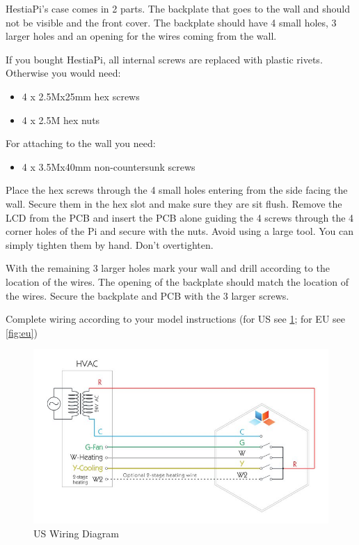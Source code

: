 HestiaPi's case comes in 2 parts. The backplate that goes to the wall and
should not be visible and the front cover. The backplate should have 4 small
holes, 3 larger holes and an opening for the wires coming from the wall.

If you bought HestiaPi, all internal screws are replaced with plastic rivets.
Otherwise you would need:

\begin{itemize}
\item 4 x 2.5Mx25mm hex screws
\item 4 x 2.5M hex nuts
\end{itemize}

For attaching to the wall you need:
\begin{itemize}
\item 4 x 3.5Mx40mm non-countersunk screws
\end{itemize}

Place the hex screws through the 4 small holes entering from the side facing
the wall. Secure them in the hex slot and make sure they are sit flush. Remove
the LCD from the PCB and insert the PCB alone guiding the 4 screws through the
4 corner holes of the Pi and secure with the nuts. Avoid using a large tool.
You can simply tighten them by hand. Don't overtighten.

With the remaining 3 larger holes mark your wall and drill according to the
location of the wires. The opening of the backplate should match the location
of the wires. Secure the backplate and PCB with the 3 larger screws.

Complete wiring according to your model instructions (for US see \ref{fig:us};
for EU see \ref{fig:eu})

\begin{figure}
  \includegraphics[width=5.0in]{img/US-hvac-wiring-diagram.jpg}
  \caption{US Wiring Diagram}
  \label{fig:us}
\end{figure}

